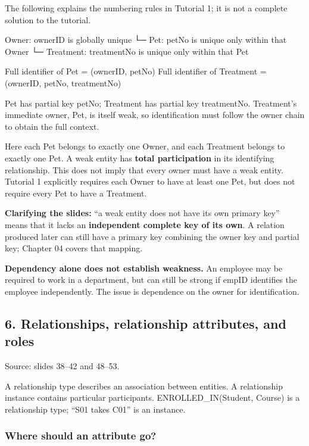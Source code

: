 The following explains the numbering rules in Tutorial 1; it is not a complete solution to the tutorial.

\begin{StudyCode}
Owner: ownerID is globally unique
  └─ Pet: petNo is unique only within that Owner
       └─ Treatment: treatmentNo is unique only within that Pet

Full identifier of Pet       = (ownerID, petNo)
Full identifier of Treatment = (ownerID, petNo, treatmentNo)
\end{StudyCode}

Pet has partial key petNo; Treatment has partial key treatmentNo. Treatment's immediate owner, Pet, is itself weak, so identification must follow the owner chain to obtain the full context.

Here each Pet belongs to exactly one Owner, and each Treatment belongs to exactly one Pet. A weak entity has \textbf{total participation} in its identifying relationship. This does not imply that every owner must have a weak entity. Tutorial 1 explicitly requires each Owner to have at least one Pet, but does not require every Pet to have a Treatment.

\textbf{Clarifying the slides:} ``a weak entity does not have its own primary key'' means that it lacks an \textbf{independent complete key of its own}. A relation produced later can still have a primary key combining the owner key and partial key; Chapter 04 covers that mapping.

\textbf{Dependency alone does not establish weakness.} An employee may be required to work in a department, but can still be strong if empID identifies the employee independently. The issue is dependence on the owner for identification.

\subsection{6. Relationships, relationship attributes, and roles}\label{02_er_modelling_en-relationships-relationship-attributes-and-roles}

Source: slides 38--42 and 48--53.

A relationship type describes an association between entities. A relationship instance contains particular participants. ENROLLED\_IN(Student, Course) is a relationship type; ``S01 takes C01'' is an instance.

\subsubsection{Where should an attribute go?}\label{02_er_modelling_en-where-should-an-attribute-go}

